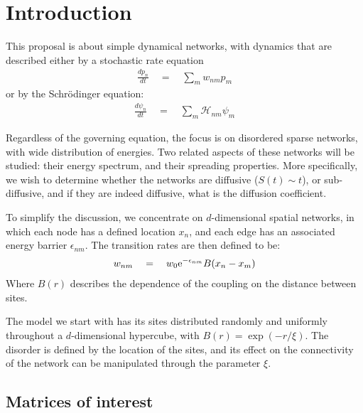 \chapter{Introduction}


This proposal is about simple dynamical networks, with dynamics
that are described either by a stochastic rate equation
%
\begin{align}
  \frac{dp_n}{dt} \quad = \quad \sum_m w_{nm}p_m
\end{align}
%
or by the Schr\"{o}dinger equation:
%
\begin{align}
  \frac{d\psi_n}{dt} \quad = \quad \sum_m \mathcal{H}_{nm}\psi_m
\end{align}
%

Regardless of the governing equation, the focus is
on disordered sparse networks, with wide distribution of energies. 
Two related aspects of these networks will be studied: their energy spectrum,
and their spreading properties. More specifically, we wish to determine
whether the networks are diffusive ($S(t)\sim t$), or sub-diffusive, and
if they are indeed diffusive, what is the diffusion coefficient. 




To simplify the discussion, we concentrate on $d$-dimensional spatial networks,
in which each node has a defined location $x_n$, and each edge has an associated 
energy barrier $\epsilon_{nm}$. The transition rates are then defined to be:
%
\begin{align}
w_{nm} \quad = \quad w_0 \mbox{e}^{-\epsilon_{nm}}B(x_n-x_m)
\end{align}
%
Where $B(r)$ describes the dependence of the coupling on the
distance between sites.


The model we start with has its sites distributed randomly and uniformly throughout
a $d$-dimensional hypercube, with $B(r) = \exp(-r/\xi)$. The disorder is defined by the location
of the sites, and its effect on the connectivity of the network can be manipulated through the 
parameter $\xi$. 



\section{Matrices of interest}\label{sec:matrix_categories}

